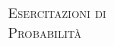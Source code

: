 \documentclass[11pt,a4paper,twoside,openright]{book}
\begin{document}




\pagestyle{empty} %
\vspace*{\fill}
\begin{center}
	{\large \textsc{Esercitazioni di}}\\
	\vspace*{0.4cm}
	{\Huge \textsc{Probabilità}}
\end{center}
\vspace*{\fill}
\newpage









%
%
%
%
%
%
%
%
%
%










\tableofcontents
\newpage


\setcounter{page}{1} %
\end{document}
